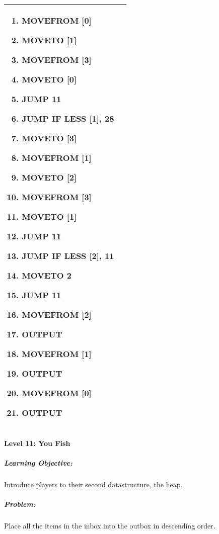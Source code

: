 \begin{center}
\begin{tabular}{ | m{5cm} | m{9cm} | }
\begin{enumerate}
                \item MOVEFROM [0]
                \item MOVETO [1]
                \item MOVEFROM [3]
                \item MOVETO [0]
                \item JUMP 11
                \item JUMP IF LESS [1], 28
                \item MOVETO [3]
                \item MOVEFROM [1]
                \item MOVETO [2]
                \item MOVEFROM [3]
                \item MOVETO [1]
                \item JUMP 11
                \item JUMP IF LESS [2], 11
                \item MOVETO 2
                \item JUMP 11
                \item MOVEFROM [2]
                \item OUTPUT
                \item MOVEFROM [1]
                \item OUTPUT
                \item MOVEFROM [0]
                \item OUTPUT
            \end{enumerate}
            \\
        \hline
    \end{tabular}
\end{center}

\paragraph{Level 11: You Fish}
\subparagraph{Learning Objective:} Introduce players to their second datastructure, the heap.

\subparagraph{Problem:} Place all the items in the inbox into the outbox in descending order.

